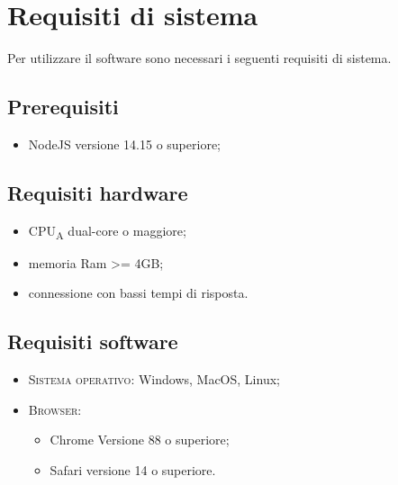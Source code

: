 \section{Requisiti di sistema}
Per utilizzare il software sono necessari i seguenti requisiti di sistema.
\subsection{Prerequisiti}
    \begin{itemize}
        \item NodeJS versione 14.15 o superiore;
    \end{itemize}
\subsection{Requisiti hardware}
\begin{itemize}
	\item CPU\textsubscript{A} dual-core o maggiore;
	\item memoria Ram >= 4GB;
	\item connessione con bassi tempi di risposta.
\end{itemize}
\subsection{Requisiti software}
\begin{itemize}
    \item \textsc{Sistema operativo}: Windows, MacOS, Linux;
    \item \textsc{Browser}: 
    \begin{itemize}
        \item Chrome Versione 88 o superiore;
        \item Safari versione 14 o superiore.
    \end{itemize}
\end{itemize}